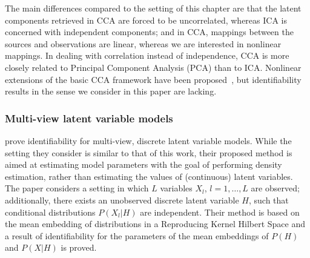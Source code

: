 The main differences compared to the setting of this chapter are that the latent components retrieved in CCA are forced to be uncorrelated, whereas ICA is concerned with independent components; and in CCA, mappings between the sources and observations are linear, whereas we are interested in nonlinear mappings.
In dealing with correlation instead of independence, CCA is more closely related to Principal Component Analysis (PCA) than to ICA.
Nonlinear extensions of the basic CCA framework have been proposed~\citep{lai2000kernel, fukumizu2007statistical, andrew2013deep, michaeli2016nonparametric}, but identifiability results in the sense we consider in this paper are lacking.


%




\subsubsection{Multi-view latent variable models}



\cite{song2014nonparametric} prove identifiability for multi-view, discrete latent variable models.
While the setting they consider is similar to that of this work, their proposed method is aimed at estimating model parameters with the goal of performing density estimation, rather than estimating the values of (continuous) latent variables.
The paper considers a setting in which $L$ variables $X_l$, $l=1, \ldots, L$ are observed; additionally, there exists an unobserved discrete latent variable $H$, such that conditional distributions $P(X_l|H)$ are independent. 
Their method is based on the mean embedding of distributions in a Reproducing Kernel Hilbert Space and a result of identifiability for the parameters of the mean embeddings of $P(H)$ and $P(X|H)$ is proved.

